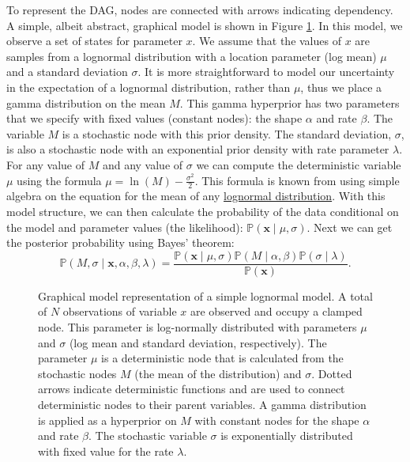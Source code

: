 To represent the DAG, nodes are connected with arrows indicating dependency. 
A simple, albeit abstract, graphical model is shown in Figure \ref{simpleGM}. 
In this model, we observe a set of states for parameter $x$. 
We assume that the values of $x$ are samples from a lognormal distribution with a location parameter (log mean) $\mu$ and a standard deviation $\sigma$. 
It is more straightforward to model our uncertainty in the expectation of a lognormal distribution, rather than $\mu$, thus we place a gamma distribution on the mean $M$. 
This gamma hyperprior has two parameters that we specify with fixed values (constant nodes): the shape $\alpha$ and rate $\beta$. 
The variable $M$ is a stochastic node with this prior density.
The standard deviation, $\sigma$, is also a stochastic node with an exponential prior density with rate parameter $\lambda$.
For any value of $M$ and any value of $\sigma$ we can compute the deterministic variable $\mu$ using the formula $\mu = \ln(M) - \frac{\sigma^2}{2}$. 
This formula is known from using simple algebra on the equation for the mean of any \href{http://en.wikipedia.org/wiki/Log-normal_distribution}{lognormal distribution}.
With this model structure, we can then calculate the probability of the data conditional on the model and parameter values (the likelihood): 
$\mathbb{P}(\boldsymbol{x} \mid \mu, \sigma)$. 
Next we can get the posterior probability using Bayes' theorem:
$$\mathbb{P}(M,\sigma \mid \boldsymbol{x}, \alpha, \beta, \lambda) = \frac{\mathbb{P}(\boldsymbol{x} \mid \mu, \sigma) \mathbb{P}(M \mid \alpha,\beta) \mathbb{P}(\sigma \mid \lambda)}{\mathbb{P}(\boldsymbol{x})}.$$
\begin{figure}[h!]
\centering
{}
\caption{\small Graphical model representation of a simple lognormal model. A total of $N$ observations of variable $x$ are observed and occupy a clamped node. 
This parameter is log-normally distributed with parameters $\mu$ and $\sigma$ (log mean and standard deviation, respectively). 
The parameter $\mu$ is a deterministic node that is calculated from the stochastic nodes $M$ (the mean of the distribution) and $\sigma$. 
Dotted arrows indicate deterministic functions and are used to connect deterministic nodes to their parent variables. 
A gamma distribution is applied as a hyperprior on $M$ with constant nodes for the shape $\alpha$ and rate $\beta$.
The stochastic variable $\sigma$ is exponentially distributed with fixed value for the rate $\lambda$.
}
\label{simpleGM}
\end{figure}




